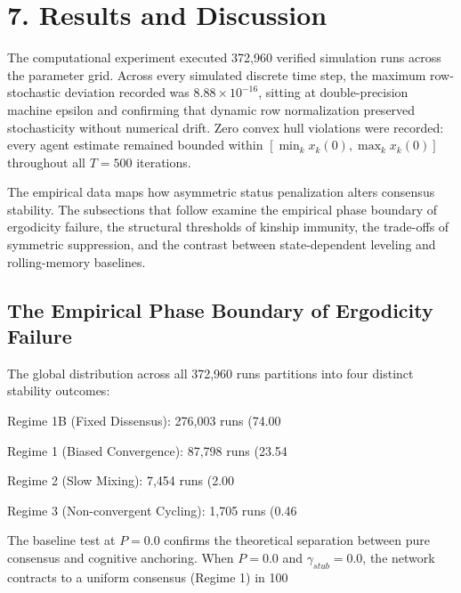 \section{7. Results and Discussion}
The computational experiment executed 372,960 verified simulation runs across the parameter grid. Across every simulated discrete time step, the maximum row-stochastic deviation recorded was $8.88 \times 10^{-16}$, sitting at double-precision machine epsilon and confirming that dynamic row normalization preserved stochasticity without numerical drift\cite{degroot1974reaching}. Zero convex hull violations were recorded: every agent estimate remained bounded within $[\min_k x_k(0), \max_k x_k(0)]$ throughout all $T = 500$ iterations\cite{degroot1974reaching}.

The empirical data maps how asymmetric status penalization alters consensus stability. The subsections that follow examine the empirical phase boundary of ergodicity failure, the structural thresholds of kinship immunity, the trade-offs of symmetric suppression, and the contrast between state-dependent leveling and rolling-memory baselines\cite{degroot1974reaching}.

\subsection{The Empirical Phase Boundary of Ergodicity Failure}
The global distribution across all 372,960 runs partitions into four distinct stability outcomes\cite{acemoglu2013opinion}:

Regime 1B (Fixed Dissensus): 276,003 runs (74.00%

Regime 1 (Biased Convergence): 87,798 runs (23.54%

Regime 2 (Slow Mixing): 7,454 runs (2.00%

Regime 3 (Non-convergent Cycling): 1,705 runs (0.46%

The baseline test at $P = 0.0$ confirms the theoretical separation between pure consensus and cognitive anchoring\cite{acemoglu2013opinion}. When $P = 0.0$ and $\gamma_{stub} = 0.0$, the network contracts to a uniform consensus (Regime 1) in 100%

